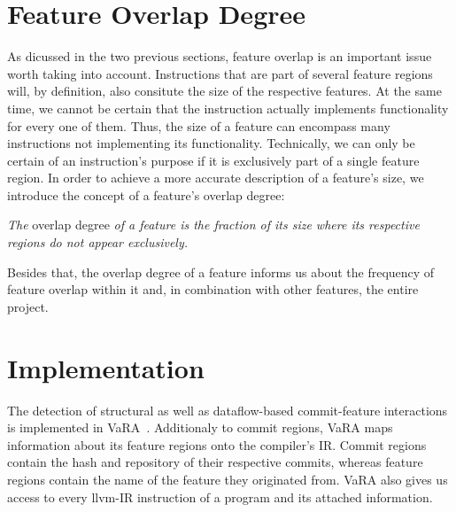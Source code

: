 \section{Feature Overlap Degree}\label{sec:feature_overlap_degree}
As dicussed in the two previous sections, feature overlap is an important issue worth taking into account.
Instructions that are part of several feature regions will, by definition, also consitute the size of the respective features.
At the same time, we cannot be certain that the instruction actually implements functionality for every one of them.
Thus, the size of a feature can encompass many instructions not implementing its functionality.
Technically, we can only be certain of an instruction's purpose if it is exclusively part of a single feature region.
In order to achieve a more accurate description of a feature's size, we introduce the concept of a feature's overlap degree:
\begin{definition} \label{def:feature_overlap_degree}
\emph{The} overlap degree \emph{of a feature is the fraction of its size where its respective regions do not appear exclusively.}
\end{definition}
Besides that, the overlap degree of a feature informs us about the frequency of feature overlap within it and, in combination with other features, the entire project.

\section{Implementation}\label{ch:implementation}

The detection of structural as well as dataflow-based commit-feature interactions is implemented in VaRA~\cite{VaRA2023}.
Additionaly to commit regions, VaRA maps information about its feature regions onto the compiler's IR.
Commit regions contain the hash and repository of their respective commits, whereas feature regions contain the name of the feature they originated from.
VaRA also gives us access to every llvm-IR instruction of a program and its attached information.

